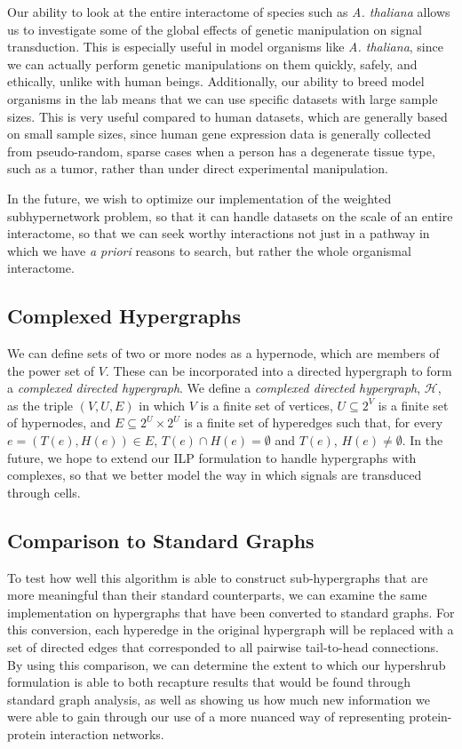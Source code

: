 \documentclass[12pt,twoside]{reedthesis}
\theoremstyle{definition}
\begin{document}
   Our ability to look at the entire interactome of species such as \textit{A. thaliana} allows us to investigate some of the global effects of genetic manipulation on signal transduction. This is especially useful in model organisms like \textit{A. thaliana}, since we can actually perform genetic manipulations on them quickly, safely, and ethically, unlike with human beings. Additionally, our ability to breed model organisms in the lab means that we can use specific datasets with large sample sizes. This is very useful compared to human datasets, which are generally based on small sample sizes, since human gene expression data is generally collected from pseudo-random, sparse cases when a person has a degenerate tissue type, such as a tumor, rather than under direct experimental manipulation.\par

   In the future, we wish to optimize our implementation of the weighted subhypernetwork problem, so that it can handle datasets on the scale of an entire interactome, so that we can seek worthy interactions not just in a pathway in which we have \textit{a priori} reasons to search, but rather the whole organismal interactome.

   \subsection{Complexed Hypergraphs}

   We can define sets of two or more nodes as a hypernode, which are members of the power set of $V$.  These can be incorporated into a directed hypergraph to form a \textit{complexed directed hypergraph}.  We define a \textit{complexed directed hypergraph}, $\mathcal{H}$, as the triple $(V,U,E)$ in which $V$ is a finite set of vertices, $U \subseteq 2^V$ is a finite set of hypernodes, and $E \subseteq 2^U \times 2^U$ is a finite set of hyperedges such that, for every $e=(T(e),H(e)) \in E$, $T(e) \cap H(e) = \emptyset$ and $T(e)$, $H(e) \neq \emptyset$. In the future, we hope to extend our ILP formulation to handle hypergraphs with complexes, so that we better model the way in which signals are transduced through cells.\par

   \subsection{Comparison to Standard Graphs}

   To test how well this algorithm is able to construct sub-hypergraphs that are more meaningful than their standard counterparts, we can examine the same implementation on hypergraphs that have been converted to standard graphs. For this conversion, each hyperedge in the original hypergraph will be replaced with a set of directed edges that corresponded to all pairwise tail-to-head connections. By using this comparison, we can determine the extent to which our hypershrub formulation is able to both recapture results that would be found through standard graph analysis, as well as showing us how much new information we were able to gain through our use of a more nuanced way of representing protein-protein interaction networks.
\end{document}

